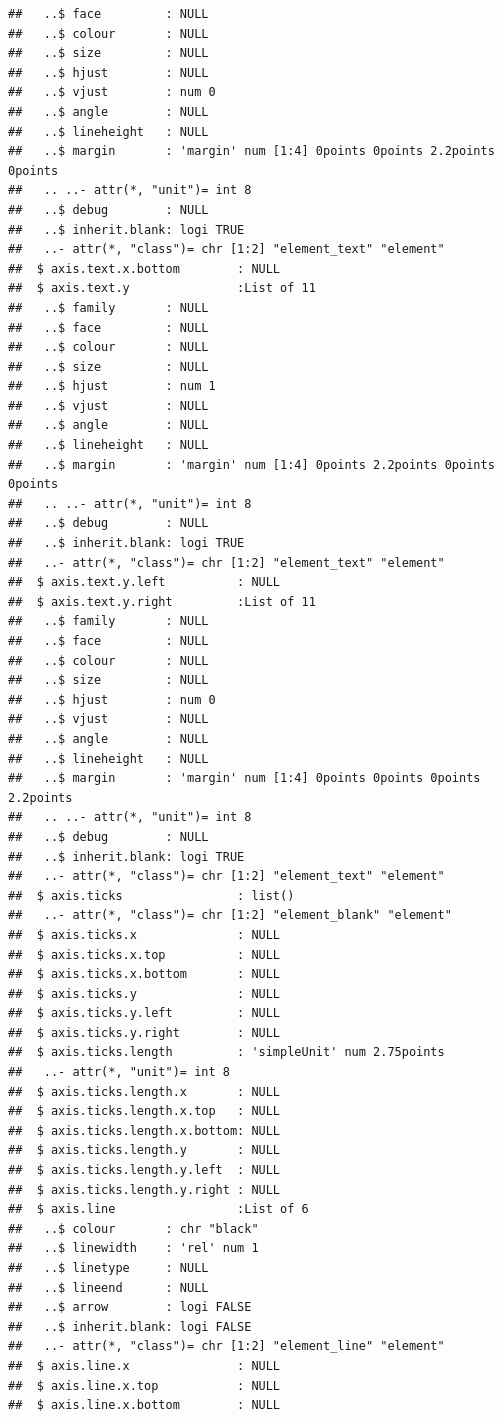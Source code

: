 \documentclass[12pt,preprint, authoryear]{elsarticle}
\numberwithin{equation}{section}
\numberwithin{figure}{section}
\numberwithin{table}{section}
\begin{document}
\begin{verbatim}
##   ..$ face         : NULL
##   ..$ colour       : NULL
##   ..$ size         : NULL
##   ..$ hjust        : NULL
##   ..$ vjust        : num 0
##   ..$ angle        : NULL
##   ..$ lineheight   : NULL
##   ..$ margin       : 'margin' num [1:4] 0points 0points 2.2points 0points
##   .. ..- attr(*, "unit")= int 8
##   ..$ debug        : NULL
##   ..$ inherit.blank: logi TRUE
##   ..- attr(*, "class")= chr [1:2] "element_text" "element"
##  $ axis.text.x.bottom        : NULL
##  $ axis.text.y               :List of 11
##   ..$ family       : NULL
##   ..$ face         : NULL
##   ..$ colour       : NULL
##   ..$ size         : NULL
##   ..$ hjust        : num 1
##   ..$ vjust        : NULL
##   ..$ angle        : NULL
##   ..$ lineheight   : NULL
##   ..$ margin       : 'margin' num [1:4] 0points 2.2points 0points 0points
##   .. ..- attr(*, "unit")= int 8
##   ..$ debug        : NULL
##   ..$ inherit.blank: logi TRUE
##   ..- attr(*, "class")= chr [1:2] "element_text" "element"
##  $ axis.text.y.left          : NULL
##  $ axis.text.y.right         :List of 11
##   ..$ family       : NULL
##   ..$ face         : NULL
##   ..$ colour       : NULL
##   ..$ size         : NULL
##   ..$ hjust        : num 0
##   ..$ vjust        : NULL
##   ..$ angle        : NULL
##   ..$ lineheight   : NULL
##   ..$ margin       : 'margin' num [1:4] 0points 0points 0points 2.2points
##   .. ..- attr(*, "unit")= int 8
##   ..$ debug        : NULL
##   ..$ inherit.blank: logi TRUE
##   ..- attr(*, "class")= chr [1:2] "element_text" "element"
##  $ axis.ticks                : list()
##   ..- attr(*, "class")= chr [1:2] "element_blank" "element"
##  $ axis.ticks.x              : NULL
##  $ axis.ticks.x.top          : NULL
##  $ axis.ticks.x.bottom       : NULL
##  $ axis.ticks.y              : NULL
##  $ axis.ticks.y.left         : NULL
##  $ axis.ticks.y.right        : NULL
##  $ axis.ticks.length         : 'simpleUnit' num 2.75points
##   ..- attr(*, "unit")= int 8
##  $ axis.ticks.length.x       : NULL
##  $ axis.ticks.length.x.top   : NULL
##  $ axis.ticks.length.x.bottom: NULL
##  $ axis.ticks.length.y       : NULL
##  $ axis.ticks.length.y.left  : NULL
##  $ axis.ticks.length.y.right : NULL
##  $ axis.line                 :List of 6
##   ..$ colour       : chr "black"
##   ..$ linewidth    : 'rel' num 1
##   ..$ linetype     : NULL
##   ..$ lineend      : NULL
##   ..$ arrow        : logi FALSE
##   ..$ inherit.blank: logi FALSE
##   ..- attr(*, "class")= chr [1:2] "element_line" "element"
##  $ axis.line.x               : NULL
##  $ axis.line.x.top           : NULL
##  $ axis.line.x.bottom        : NULL

\end{verbatim}
\end{document}
